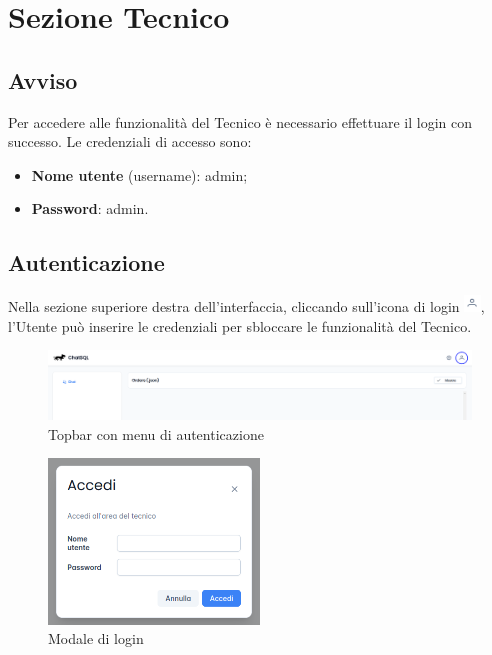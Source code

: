 \section{Sezione Tecnico}
\label{sec:sezTecnico}

\subsection*{Avviso}
Per accedere alle funzionalità del Tecnico è necessario effettuare il login con successo. Le credenziali di accesso sono:
\begin{itemize}
    \item \textbf{Nome utente} (username): admin;
    \item \textbf{Password}: admin. 
\end{itemize}

\subsection{Autenticazione}
Nella sezione superiore destra dell'interfaccia, cliccando sull'icona di login \includegraphics[height=1.2em]{assets/user_icon.png}, l'Utente può inserire le credenziali per sbloccare le funzionalità del Tecnico.
\begin{figure}[H]
  \centering
  \includegraphics[width=1\textwidth]{assets/login_topbar.png}
  \caption{Topbar con menu di autenticazione}
\end{figure}
\begin{figure}[H]
  \centering
  \includegraphics[width=0.50\textwidth]{assets/login_modal.png}
  \caption{Modale di login}
\end{figure}

